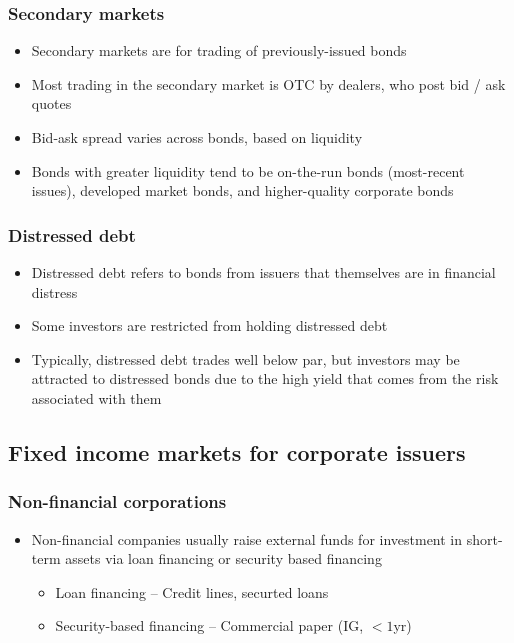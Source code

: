 \documentclass[../notes_compiled.tex]{subfiles}
\begin{document}
\subsubsection*{Secondary markets}
\begin{itemize}
\item[] Secondary markets are for trading of previously-issued bonds
\item Most trading in the secondary market is OTC by dealers, who post bid / ask quotes
\item Bid-ask spread varies across bonds, based on liquidity
\item Bonds with greater liquidity tend to be on-the-run bonds (most-recent issues), developed market bonds, and higher-quality corporate bonds
\end{itemize}

\subsubsection*{Distressed debt}
\begin{itemize}
\item Distressed debt refers to bonds from issuers that themselves are in financial distress
\item Some investors are restricted from holding distressed debt
\item Typically, distressed debt trades well below par, but investors may be attracted to distressed bonds due to the high yield that comes from the risk associated with them
\end{itemize}

\subsection{Fixed income markets for corporate issuers}
\subsubsection{Non-financial corporations}
\begin{itemize}
\item Non-financial companies usually raise external funds for investment in short-term assets via loan financing or security based financing
\begin{itemize}
\item Loan financing -- Credit lines, securted loans
\item Security-based financing -- Commercial paper (IG, $<1$yr)
\end{itemize}
\end{itemize}
\end{document}
